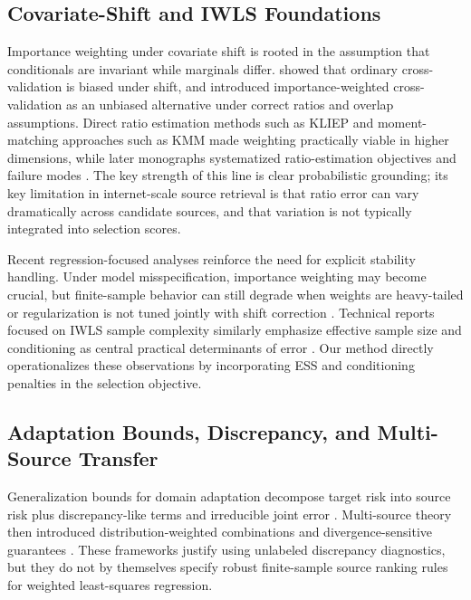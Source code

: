 \documentclass{article} %
\begin{document}
\subsection{Covariate-Shift and IWLS Foundations}
Importance weighting under covariate shift is rooted in the assumption that conditionals are invariant while marginals differ. \citet{Sugiyama2007IWCV} showed that ordinary cross-validation is biased under shift, and introduced importance-weighted cross-validation as an unbiased alternative under correct ratios and overlap assumptions. Direct ratio estimation methods such as KLIEP \citep{Sugiyama2007KLIEP} and moment-matching approaches such as KMM \citep{Huang2006KMM} made weighting practically viable in higher dimensions, while later monographs systematized ratio-estimation objectives and failure modes \citep{Sugiyama2012DensityRatioBook}. The key strength of this line is clear probabilistic grounding; its key limitation in internet-scale source retrieval is that ratio error can vary dramatically across candidate sources, and that variation is not typically integrated into selection scores.

Recent regression-focused analyses reinforce the need for explicit stability handling. Under model misspecification, importance weighting may become crucial, but finite-sample behavior can still degrade when weights are heavy-tailed or regularization is not tuned jointly with shift correction \citep{Gogolashvili2023NeedIW,Kanagawa2023Regularization,Feng2024Quantile}. Technical reports focused on IWLS sample complexity similarly emphasize effective sample size and conditioning as central practical determinants of error \citep{RICAM2021IWLS}. Our method directly operationalizes these observations by incorporating ESS and conditioning penalties in the selection objective.

\subsection{Adaptation Bounds, Discrepancy, and Multi-Source Transfer}
Generalization bounds for domain adaptation decompose target risk into source risk plus discrepancy-like terms and irreducible joint error \citep{BenDavid2010Theory,Mansour2009Discrepancy}. Multi-source theory then introduced distribution-weighted combinations and divergence-sensitive guarantees \citep{Mansour2010Renyi}. These frameworks justify using unlabeled discrepancy diagnostics, but they do not by themselves specify robust finite-sample source ranking rules for weighted least-squares regression.
\end{document}
